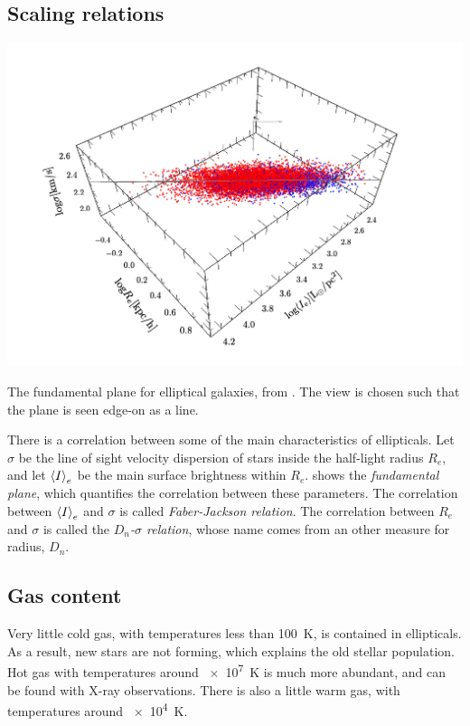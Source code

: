 \subsection{Scaling relations}
\begin{marginfigure}
	\includegraphics[width=\textwidth]{img/ch-05/fundamental-plane.png}
	\caption{The fundamental plane for elliptical galaxies, from \cite{Magoulas:2012jy}. The view is chosen such that the plane is seen edge-on as a line.}
	\label{fig:fundamental-plane}
\end{marginfigure}
There is a correlation between some of the main characteristics of ellipticals.
Let $\sigma$ be the line of sight velocity dispersion of stars inside the half-light radius $R_e$,
and let $\left\langle I \right\rangle_e$ be the main surface brightness within $R_e$.
 shows the \emph{fundamental plane}, which quantifies the correlation between these parameters.
The correlation between $\left\langle I \right\rangle_e$ and $\sigma$ is called \emph{Faber-Jackson relation}.
The correlation between $R_e$ and $\sigma$ is called the \emph{$D_n$-$\sigma$ relation}, whose name comes from an other measure for radius, $D_n$.


\subsection{Gas content}
Very little cold gas, with temperatures less than \SI{100}{\kelvin}, is contained in ellipticals.
As a result, new stars are not forming, which explains the old stellar population.
Hot gas with temperatures around \SI{e7}{\kelvin} is much more abundant, and can be found with X-ray observations.
There is also a little warm gas, with temperatures around \SI{e4}{\kelvin}.







